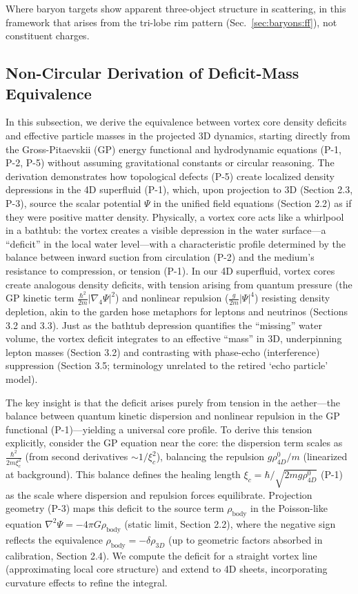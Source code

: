 Where baryon targets show apparent three-object structure in scattering, in this framework that arises from the tri-lobe rim pattern (Sec.~\ref{sec:baryons:ff}), not constituent charges.

\subsection{Non-Circular Derivation of Deficit-Mass Equivalence}

In this subsection, we derive the equivalence between vortex core density deficits and effective particle masses in the projected 3D dynamics, starting directly from the Gross-Pitaevskii (GP) energy functional and hydrodynamic equations (P-1, P-2, P-5) without assuming gravitational constants or circular reasoning. The derivation demonstrates how topological defects (P-5) create localized density depressions in the 4D superfluid (P-1), which, upon projection to 3D (Section 2.3, P-3), source the scalar potential $\Psi$ in the unified field equations (Section 2.2) as if they were positive matter density. Physically, a vortex core acts like a whirlpool in a bathtub: the vortex creates a visible depression in the water surface---a ``deficit'' in the local water level---with a characteristic profile determined by the balance between inward suction from circulation (P-2) and the medium's resistance to compression, or tension (P-1). In our 4D superfluid, vortex cores create analogous density deficits, with tension arising from quantum pressure (the GP kinetic term $\frac{\hbar^2}{2m} |\nabla_4 \Psi|^2$) and nonlinear repulsion ($\frac{g}{2m} |\Psi|^4$) resisting density depletion, akin to the garden hose metaphors for leptons and neutrinos (Sections 3.2 and 3.3). Just as the bathtub depression quantifies the ``missing'' water volume, the vortex deficit integrates to an effective ``mass'' in 3D, underpinning lepton masses (Section 3.2) and contrasting with phase-echo (interference) suppression (Section 3.5; terminology unrelated to the retired ‘echo particle’ model).

The key insight is that the deficit arises purely from tension in the aether---the balance between quantum kinetic dispersion and nonlinear repulsion in the GP functional (P-1)---yielding a universal core profile. To derive this tension explicitly, consider the GP equation near the core: the dispersion term scales as $\frac{\hbar^2}{2 m \xi_c^2}$ (from second derivatives $\sim 1/\xi_c^2$), balancing the repulsion $g \rho_{4D}^0 / m$ (linearized at background). This balance defines the healing length $\xi_c = \hbar / \sqrt{2 m g \rho_{4D}^0}$ (P-1) as the scale where dispersion and repulsion forces equilibrate. Projection geometry (P-3) maps this deficit to the source term $\rho_{\text{body}}$ in the Poisson-like equation $\nabla^2 \Psi = -4\pi G \rho_{\text{body}}$ (static limit, Section 2.2), where the negative sign reflects the equivalence $\rho_{\text{body}} = - \delta \rho_{3D}$ (up to geometric factors absorbed in calibration, Section 2.4). We compute the deficit for a straight vortex line (approximating local core structure) and extend to 4D sheets, incorporating curvature effects to refine the integral.

